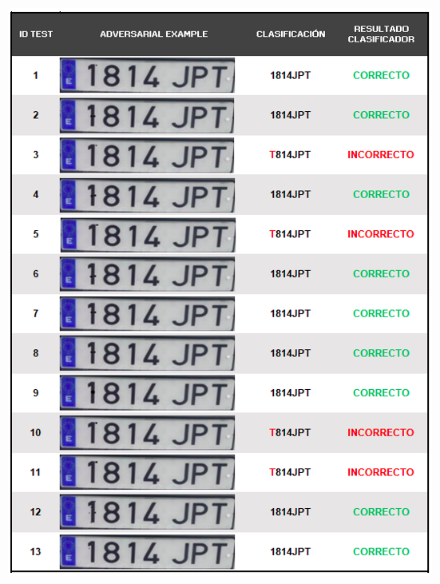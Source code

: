 \begin{figure}[!h]
    \centering
    \includegraphics[scale = 0.85]{Figures/figura_69_1.PNG}
    \label{fig:69_1}
\end{figure}

